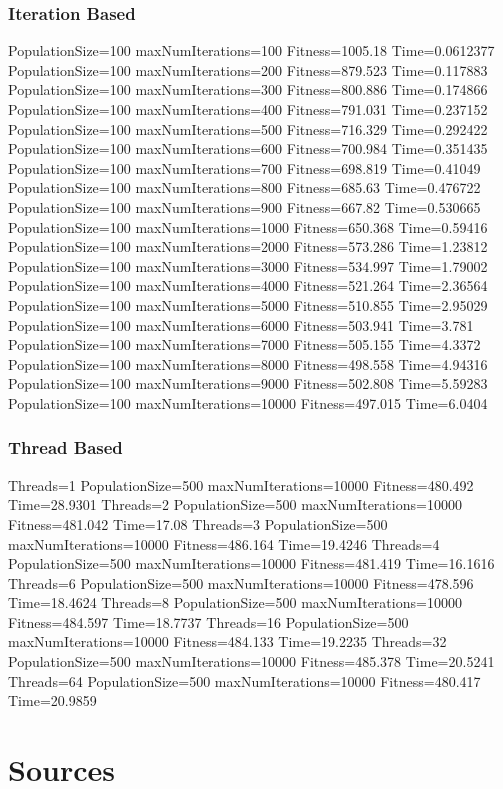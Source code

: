 \documentclass[10pt,letterpaper]{article}
\begin{document}
\subsubsection{Iteration Based}
PopulationSize=100 maxNumIterations=100 Fitness=1005.18 Time=0.0612377
PopulationSize=100 maxNumIterations=200 Fitness=879.523 Time=0.117883
PopulationSize=100 maxNumIterations=300 Fitness=800.886 Time=0.174866
PopulationSize=100 maxNumIterations=400 Fitness=791.031 Time=0.237152
PopulationSize=100 maxNumIterations=500 Fitness=716.329 Time=0.292422
PopulationSize=100 maxNumIterations=600 Fitness=700.984 Time=0.351435
PopulationSize=100 maxNumIterations=700 Fitness=698.819 Time=0.41049
PopulationSize=100 maxNumIterations=800 Fitness=685.63 Time=0.476722
PopulationSize=100 maxNumIterations=900 Fitness=667.82 Time=0.530665
PopulationSize=100 maxNumIterations=1000 Fitness=650.368 Time=0.59416
PopulationSize=100 maxNumIterations=2000 Fitness=573.286 Time=1.23812
PopulationSize=100 maxNumIterations=3000 Fitness=534.997 Time=1.79002
PopulationSize=100 maxNumIterations=4000 Fitness=521.264 Time=2.36564
PopulationSize=100 maxNumIterations=5000 Fitness=510.855 Time=2.95029
PopulationSize=100 maxNumIterations=6000 Fitness=503.941 Time=3.781
PopulationSize=100 maxNumIterations=7000 Fitness=505.155 Time=4.3372
PopulationSize=100 maxNumIterations=8000 Fitness=498.558 Time=4.94316
PopulationSize=100 maxNumIterations=9000 Fitness=502.808 Time=5.59283
PopulationSize=100 maxNumIterations=10000 Fitness=497.015 Time=6.0404

\subsubsection{Thread Based}
Threads=1 PopulationSize=500 maxNumIterations=10000 Fitness=480.492 Time=28.9301
Threads=2 PopulationSize=500 maxNumIterations=10000 Fitness=481.042 Time=17.08
Threads=3 PopulationSize=500 maxNumIterations=10000 Fitness=486.164 Time=19.4246
Threads=4 PopulationSize=500 maxNumIterations=10000 Fitness=481.419 Time=16.1616
Threads=6 PopulationSize=500 maxNumIterations=10000 Fitness=478.596 Time=18.4624
Threads=8 PopulationSize=500 maxNumIterations=10000 Fitness=484.597 Time=18.7737
Threads=16 PopulationSize=500 maxNumIterations=10000 Fitness=484.133 Time=19.2235
Threads=32 PopulationSize=500 maxNumIterations=10000 Fitness=485.378 Time=20.5241
Threads=64 PopulationSize=500 maxNumIterations=10000 Fitness=480.417 Time=20.9859








\section{Sources}
\end{document}
